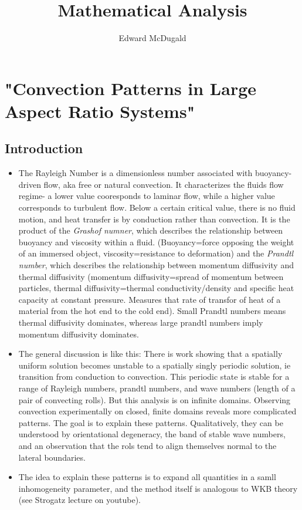 \documentclass[12pt]{article}
\title{Mathematical Analysis}
\author{Edward McDugald}
\newcounter{solution}
\begin{document}
\maketitle

\section{"Convection Patterns in Large Aspect Ratio Systems"}
\subsection{Introduction}
\begin{itemize}
    \item The Rayleigh Number is a dimensionless number associated with buoyancy-driven flow, aka free or natural convection. It characterizes the fluids flow regime- a lower value cooresponds to laminar flow, while a higher value corresponds to turbulent flow. Below a certain critical value, there is no fluid motion, and heat transfer is by conduction rather than convection. It is the product of the \emph{Grashof numner}, which describes the relationship between buoyancy and viscosity within a fluid. (Buoyancy=force opposing the weight of an immersed object, viscosity=resistance to deformation) and the \emph{Prandtl number}, which describes the relationship between momentum diffusivity and thermal diffusivity (momentum diffusivity=spread of momentum between particles, thermal diffusivity=thermal conductivity/density and specific heat capacity at constant pressure. Measures that rate of transfor of heat of a material from the hot end to the cold end). Small Prandtl numbers means thermal diffusivity dominates, whereas large prandtl numbers imply momentum diffusivity dominates.
    \item The general discussion is like this: There is work showing that a spatially uniform solution becomes unstable to a spatially singly periodic solution, ie transition from conduction to convection. This periodic state is stable for a range of Rayleigh numbers, prandtl numbers, and wave numbers (length of a pair of convecting rolls). But this analysis is on infinite domains. Observing convection experimentally on closed, finite domains reveals more complicated patterns. The goal is to explain these patterns. Qualitatively, they can be understood by orientational degeneracy, the band of stable wave numbers, and an observation that the rols tend to align themselves normal to the lateral boundaries.
    \item The idea to explain these patterns is to expand all quantities in a samll inhomogeneity parameter, and the method itself is analogous to WKB theory (see Strogatz lecture on youtube).

\end{itemize}
\end{document}
